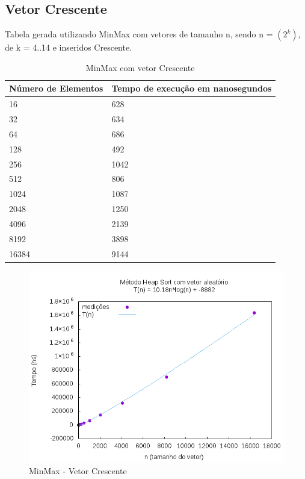 \documentclass[12pt,a4paper,twoside]{report}
\begin{document}
\subsection{Vetor Crescente}
Tabela gerada utilizando MinMax com vetores de tamanho n, sendo n = $(2^k)$, de k = 4..14 e inseridos Crescente.
\begin{table}[H]
\centering
\caption{MinMax com vetor Crescente}
\label{my-label}
\begin{tabular}{|l|l|}
\hline
\multicolumn{1}{|c|}{\textbf{Número de Elementos}} & \multicolumn{1}{c|}{\textbf{Tempo de execução em nanosegundos}} \\ \hline
16 & 628 \\ \hline
32 & 634 \\ \hline
64 & 686 \\ \hline
128 & 492 \\ \hline
256 & 1042 \\ \hline
512 & 806 \\ \hline
1024 & 1087 \\ \hline
2048 & 1250 \\ \hline
4096 & 2139 \\ \hline
8192 & 3898 \\ \hline
16384 & 9144 \\ \hline
\end{tabular}
\end{table}

\begin{figure}[H]
    \centering
    \includegraphics[width=0.7\linewidth]{graficos/HeapSort/vIntAleatorio/vIntAleatorio.png}
  \caption{MinMax - Vetor Crescente}
\end{figure}
\end{document}
